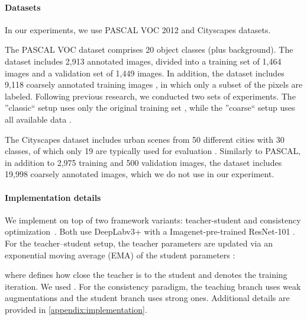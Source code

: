 \documentclass{article}
\renewcommand{\cite}[1]{\citep{#1}}
\begin{document}
\paragraph{Datasets}
In our experiments, we use PASCAL VOC 2012 \cite{voc} and Cityscapes \cite{cityscapes} datasets.

The PASCAL VOC dataset comprises 20 object classes (plus background). The dataset includes 2,913 annotated images, divided into a training set of 1,464 images and a validation set of 1,449 images. In addition, the dataset includes 9,118 coarsely annotated training images \cite{sbd}, in which only a subset of the pixels are labeled. Following previous research, we conducted two sets of experiments. The ''classic`` setup uses only the original training set \cite{wang2022semi,pseudoseg}, while the ''coarse`` setup uses all available data \cite{wang2022semi,cps,ael}.

The Cityscapes \cite{cityscapes} dataset includes urban scenes from 50 different cities with 30 classes, of which only 19 are typically used for evaluation \cite{deeplab,deeplabv3p}. Similarly to PASCAL, in addition to 2,975 training and 500 validation images, the dataset includes 19,998 coarsely annotated images, which we do not use in our experiment. 

\paragraph{Implementation details}\label{sec:model}
We implement \methodname{} on top of two framework variants: teacher-student \cite{tarvainen2017meanteacher,french2019semi} and consistency optimization~\cite{sohn2020fixmatch, unimatch}. Both use  DeepLabv3+ \cite{deeplabv3p} with a Imagenet-pre-trained \cite{ILSVRC15} ResNet-101 \cite{resnet}. For the teacher--student setup, the teacher parameters  are updated via an exponential moving average (EMA) of the student parameters \citep{tarvainen2017meanteacher}:

where  defines how close the teacher is to the student and  denotes the training iteration.  We used . 
For the consistency paradigm, the teaching branch uses weak augmentations and the student branch uses strong ones. 
Additional details are provided in \cref{appendix:implementation}.
\end{document}
